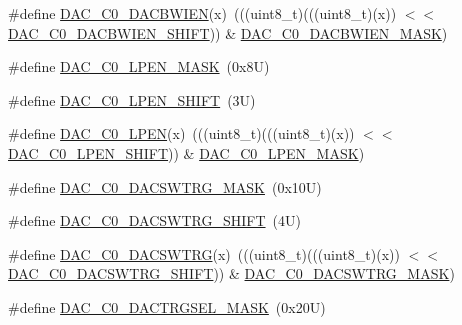 \begin{DoxyCompactItemize}
\item 
\#define \mbox{\hyperlink{group___d_a_c___register___masks_ga2409daa5e63d66eab84411f307d3a9bb}{D\+A\+C\+\_\+\+C0\+\_\+\+D\+A\+C\+B\+W\+I\+EN}}(x)~(((uint8\+\_\+t)(((uint8\+\_\+t)(x)) $<$$<$ \mbox{\hyperlink{group___d_a_c___register___masks_ga2b61f6fc85e9dc9d7c736055b47fadd1}{D\+A\+C\+\_\+\+C0\+\_\+\+D\+A\+C\+B\+W\+I\+E\+N\+\_\+\+S\+H\+I\+FT}})) \& \mbox{\hyperlink{group___d_a_c___register___masks_gaedff72359a12b93e4b61a57a0613d3cb}{D\+A\+C\+\_\+\+C0\+\_\+\+D\+A\+C\+B\+W\+I\+E\+N\+\_\+\+M\+A\+SK}})
\item 
\#define \mbox{\hyperlink{group___d_a_c___register___masks_ga54a04b9ae84c5a4f8977ae2e1a889717}{D\+A\+C\+\_\+\+C0\+\_\+\+L\+P\+E\+N\+\_\+\+M\+A\+SK}}~(0x8\+U)
\item 
\#define \mbox{\hyperlink{group___d_a_c___register___masks_ga97aaa812a3938df3559cb40b893db431}{D\+A\+C\+\_\+\+C0\+\_\+\+L\+P\+E\+N\+\_\+\+S\+H\+I\+FT}}~(3\+U)
\item 
\#define \mbox{\hyperlink{group___d_a_c___register___masks_gad377727f80a52490cc645e637df965e4}{D\+A\+C\+\_\+\+C0\+\_\+\+L\+P\+EN}}(x)~(((uint8\+\_\+t)(((uint8\+\_\+t)(x)) $<$$<$ \mbox{\hyperlink{group___d_a_c___register___masks_ga97aaa812a3938df3559cb40b893db431}{D\+A\+C\+\_\+\+C0\+\_\+\+L\+P\+E\+N\+\_\+\+S\+H\+I\+FT}})) \& \mbox{\hyperlink{group___d_a_c___register___masks_ga54a04b9ae84c5a4f8977ae2e1a889717}{D\+A\+C\+\_\+\+C0\+\_\+\+L\+P\+E\+N\+\_\+\+M\+A\+SK}})
\item 
\#define \mbox{\hyperlink{group___d_a_c___register___masks_ga7e785d90fec3c1817fc53fea41f41644}{D\+A\+C\+\_\+\+C0\+\_\+\+D\+A\+C\+S\+W\+T\+R\+G\+\_\+\+M\+A\+SK}}~(0x10\+U)
\item 
\#define \mbox{\hyperlink{group___d_a_c___register___masks_ga25e2afd71ee5cc41adde6f072c9d2604}{D\+A\+C\+\_\+\+C0\+\_\+\+D\+A\+C\+S\+W\+T\+R\+G\+\_\+\+S\+H\+I\+FT}}~(4\+U)
\item 
\#define \mbox{\hyperlink{group___d_a_c___register___masks_ga775041bb7cbeca598c59975d064b39aa}{D\+A\+C\+\_\+\+C0\+\_\+\+D\+A\+C\+S\+W\+T\+RG}}(x)~(((uint8\+\_\+t)(((uint8\+\_\+t)(x)) $<$$<$ \mbox{\hyperlink{group___d_a_c___register___masks_ga25e2afd71ee5cc41adde6f072c9d2604}{D\+A\+C\+\_\+\+C0\+\_\+\+D\+A\+C\+S\+W\+T\+R\+G\+\_\+\+S\+H\+I\+FT}})) \& \mbox{\hyperlink{group___d_a_c___register___masks_ga7e785d90fec3c1817fc53fea41f41644}{D\+A\+C\+\_\+\+C0\+\_\+\+D\+A\+C\+S\+W\+T\+R\+G\+\_\+\+M\+A\+SK}})
\item 
\#define \mbox{\hyperlink{group___d_a_c___register___masks_gac6dd81bc6500fc4b972c62bde339f31d}{D\+A\+C\+\_\+\+C0\+\_\+\+D\+A\+C\+T\+R\+G\+S\+E\+L\+\_\+\+M\+A\+SK}}~(0x20\+U)
$$
\end{DoxyCompactItemize}
